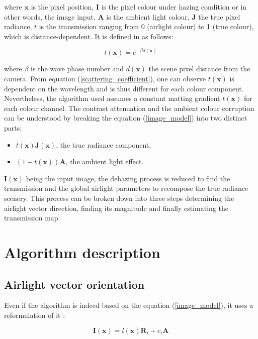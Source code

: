 \documentclass[conference]{IEEEtran}
\begin{document}
where $\mathbf{x}$ is the pixel position, $\mathbf{I}$ is the pixel colour under hazing condition or in other words, the image input, $\mathbf{A}$ is the ambient light colour,
$\mathbf{J}$ the true pixel radiance, $t$ is the transmission ranging from 0 (airlight colour)
to 1 (true colour), which is distance-dependent. It is defined in \cite{dehaze} as follows:

\begin{equation}
\label{scattering_coefficient}
t(\mathbf{x}) = e^{-\beta d(\mathbf{x})}
\end{equation}

where $\beta$ is the wave phase number and $d(\textbf{x})$ the scene pixel distance from the camera.  From equation (\ref{scattering_coefficient}),
one can observe $t(\mathbf{x})$ is dependent on the wavelength and is thus different for each colour component.  Nevertheless, the algorithm used assumes a constant matting gradient $t(\mathbf{x})$ for each colour channel.
The contrast attenuation and the ambient colour corruption can be understood by breaking the equation (\ref{image_model}) into two distinct parts: 
\begin{itemize}
    \item $t(\mathbf{x}) \mathbf{J}(\mathbf{x})$, the true radiance component,
    \item $(1-t(\mathbf{x})) \mathbf{A}$, the ambient light effect.
\end{itemize}
$\mathbf{I}(\mathbf{x})$ being the input image, the dehazing process is reduced to find the transmission and the global airlight parameters to recompose
the true radiance scenery.  This process can be broken down into three steps determining the airlight vector direction, finding its magnitude and finally estimating the transmission map.

\section{Algorithm description}
\subsection{Airlight vector orientation}  
\label{AmauryPart}

Even if the algorithm is indeed based on the equation (\ref{image_model}), it uses a reformulation of it \cite{airlight}:

\begin{equation}
\label{shading_coefficient}
\mathbf{I}(\mathbf{x}) = l(\mathbf{x}) \mathbf{R}_i + c_i \mathbf{A}
\end{equation}
\end{document}
